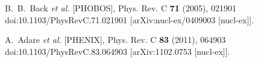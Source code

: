\begin{thebibliography}{99}
B.~B.~Back \textit{et al.} [PHOBOS],
Phys. Rev. C \textbf{71} (2005), 021901
doi:10.1103/PhysRevC.71.021901
[arXiv:nucl-ex/0409003 [nucl-ex]].

A.~Adare \textit{et al.} [PHENIX],
Phys. Rev. C \textbf{83} (2011), 064903
doi:10.1103/PhysRevC.83.064903
[arXiv:1102.0753 [nucl-ex]].


\end{thebibliography}
